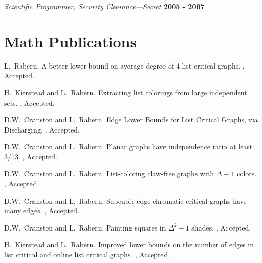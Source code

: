 \documentclass[margin,line]{res}
\begin{document}
\begin{resume}
\vspace{-.4cm}
{\em Scientific Programmer, Security Clearance---Secret} \hfill {\bf 2005 - 2007}

\section{\sc Math Publications}

\begin{enumerate}[{[}1{]}]

\item
L.~Rabern.
\newblock A better lower bound on average degree of 4-list-critical graphs.
, Accepted.
	
	\smallskip
	
	\item
H.~Kierstead and L.~Rabern.
\newblock Extracting list colorings from large independent sets.
, Accepted.

\smallskip

	\item
	D.W.~Cranston and L.~Rabern.
	\newblock Edge Lower Bounds for List Critical Graphs, via Discharging.
	, Accepted.
	\smallskip

\item
D.W.~Cranston and L.~Rabern.
\newblock Planar graphs have independence ratio at least 3/13.
, Accepted.
\smallskip

\item
D.W.~Cranston and L.~Rabern.
\newblock List-coloring claw-free graphs with $\Delta - 1$ colors.
, Accepted.
\smallskip

\item
D.W.~Cranston and L.~Rabern.
\newblock Subcubic edge chromatic critical graphs have many edges.
, Accepted.
\smallskip

\item
D.W.~Cranston and L.~Rabern.
\newblock Painting squares in $\Delta^2 - 1$ shades.
, Accepted.
	
	\smallskip
	
	\item
H.~Kierstead and L.~Rabern.
\newblock Improved lower bounds on the number of edges in list critical and online list critical graphs.
, Accepted.

\smallskip
	

\end{enumerate}
\end{resume}
\end{document}
